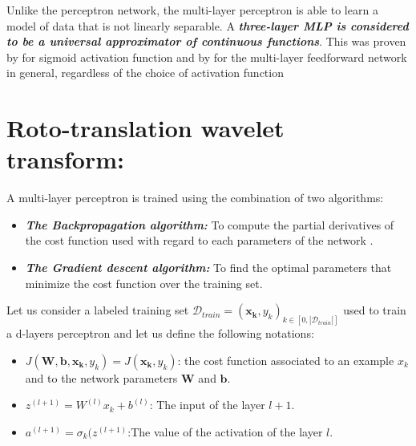 \documentclass[a4paper,11pt]{report}
\newcommand{\Important}[1]{\textbf{{\em #1}}}
\begin{document}
		Unlike the perceptron network, the multi-layer perceptron is able to learn a model of data that is not linearly separable. A \Important{three-layer MLP is considered to be a universal approximator of continuous functions}. This was proven by \cite{Cybenko_1989} for sigmoid activation function and by \cite{Hornik_1991} for the multi-layer feedforward network in general, regardless of the choice of activation function
		
		
	\section{Roto-translation wavelet transform:}
		\label{seq:Artificial neural networks/Training by error backpropagation}
			
		A multi-layer perceptron is trained using the combination of two algorithms:\\
		\begin{itemize}
			\item \Important{The Backpropagation algorithm:} To compute the partial derivatives of the cost function used with regard to each parameters of the network \cite{LeCun_1985,Rumelhart_1986}.\\
			\item \Important{The Gradient descent algorithm:} To find the optimal parameters that minimize the cost function over the training set.\\
		\end{itemize}
 		
 		Let us consider a labeled training set $\mathcal{D}_{train} = (\mathbf{x_{k}},y_{k})_{k \in [0, |\mathcal{D}_{train}|]}$ used to train a d-layers perceptron and let us define the following notations:\\
 		
 		\begin{itemize}
			\item $J(\mathbf{W},\mathbf{b},\mathbf{x_{k}},y_{k})= J(\mathbf{x_{k}},y_{k})$: the cost function associated to an example $x_{k}$ and to the network parameters $\mathbf{W}$ and $\mathbf{b}$.\\
			
			\item $z^{(l+1)} = W^{(l)} x_{k} + b^{(l)}$: The input of the layer $l+1$.\\
			
			\item $a^{(l+1)} = \sigma_{k}(z^{(l+1)}$:The value of the activation of the layer $l$.\\ 
 		\end{itemize}
\end{document}
